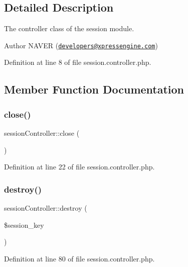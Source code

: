 \subsection{Detailed Description}
The controller class of the session module. 

\begin{DoxyAuthor}{Author}
N\+A\+V\+ER (\href{mailto:developers@xpressengine.com}{\tt developers@xpressengine.\+com}) 
\end{DoxyAuthor}


Definition at line 8 of file session.\+controller.\+php.



\subsection{Member Function Documentation}
\hypertarget{classsessionController_af48b21176f7a2d12c859bb8421e04f82}{}\label{classsessionController_af48b21176f7a2d12c859bb8421e04f82} 
\subsubsection{\texorpdfstring{close()}{close()}}
{\footnotesize\ttfamily session\+Controller\+::close (\begin{DoxyParamCaption}{ }\end{DoxyParamCaption})}



Definition at line 22 of file session.\+controller.\+php.

\hypertarget{classsessionController_a695f52cca73bf4fc0efb1d35a79023c6}{}\label{classsessionController_a695f52cca73bf4fc0efb1d35a79023c6} 
\subsubsection{\texorpdfstring{destroy()}{destroy()}}
{\footnotesize\ttfamily session\+Controller\+::destroy (\begin{DoxyParamCaption}\item[{}]{\$session\+\_\+key }\end{DoxyParamCaption})}



Definition at line 80 of file session.\+controller.\+php.

